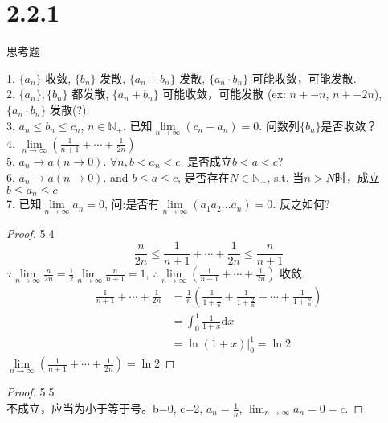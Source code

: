 \section{2.2.1 }思考题\\
\begin{qs*}
	1. $ \{a_n\} $ 收敛, $ \{b_n\} $ 发散, $ \{a_n+b_n\} $ 发散,  $ \{a_n\cdot b_n\} $ 可能收敛，可能发散.\\
	2. $ \{a_n\}, \{b_n\} $ 都发散, $ \{a_n+b_n\} $ 可能收敛，可能发散 (ex: $ n+-n $,   $n+-2n $),  $ \{a_n\cdot b_n\} $ 发散(?).\\
	3. $ a_n\leqslant b_n \leqslant c_n $, $ n\in\mathbb{N}_+ $. 已知$ \lim\limits_{n\rightarrow\infty}(c_n-a_n)=0 $. 问数列$ \{b_n\} $是否收敛？\\
	4. $ \lim\limits_{n\rightarrow\infty}(\frac{1}{n+1} + \cdots + \frac{1}{2n}) $\\
	5. $ a_n\rightarrow a(n\rightarrow 0) $. $ \forall n, b<a_n<c $. 是否成立$ b<a<c $?\\
	6. $ a_n \rightarrow a(n\rightarrow 0) $. and $ b\leqslant a\leqslant c  $, 是否存在$ N\in\mathbb{N}_+ $, s.t. 当$ n>N $时，成立$ b\leqslant a_n \leqslant c$\\
	7. 已知$ \lim\limits_{n\rightarrow\infty}a_n = 0 $, 问:是否有$ \lim\limits_{n\rightarrow\infty} (a_1a_2\dots a_n) = 0 $. 反之如何?
\end{qs*}
\begin{proof}5.4\\
	\begin{equation*}
		 \frac{n}{2n} \leqslant \frac{1}{n+1} + \cdots + \frac{1}{2n}  \leqslant \frac{n}{n+1}
	\end{equation*}
	$ \because 
	\lim\limits_{n\rightarrow\infty} 
	\frac{n}{2n} = \frac{1}{2}
	\lim\limits_{n\rightarrow\infty} 
	\frac{n}{n+1} = 1
	$, $ \therefore \lim\limits_{n\rightarrow\infty}(\frac{1}{n+1} + \cdots + \frac{1}{2n} ) $ 收敛.
	\begin{align*}
		\frac{1}{n+1} + \cdots + \frac{1}{2n}
		&= \frac{1}{n}(\frac{1}{1+\frac{1}{n}} + \frac{1}{1+\frac{2}{n}} + \cdots + \frac{1}{1+\frac{n}{n}})\\
		&= \int_{0}^{1}\frac{1}{1+x}\text{d}x\\
		&= \ln(1+x)|_0^1 = \ln{2}
	\end{align*}
	$ \lim\limits_{n\rightarrow\infty}(\frac{1}{n+1} + \cdots + \frac{1}{2n})=\ln{2}  $	
\end{proof}
\begin{proof}5.5\\
	不成立，应当为小于等于号。b=0, c=2, $ a_n = \frac{1}{n} $, $ \lim_{n\rightarrow\infty}a_n = 0 = c $.
\end{proof}
